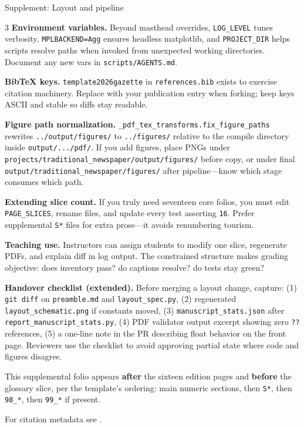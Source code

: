 \documentclass[
  ignorenonframetext,
]{beamer}
\begin{document}
\begin{frame}[fragile]{Supplement: Layout and pipeline}
\begin{multicols}{3}
\textbf{Environment variables.} Beyond masthead overrides,
\texttt{LOG\_LEVEL} tunes verbosity, \texttt{MPLBACKEND=Agg} ensures
headless matplotlib, and \texttt{PROJECT\_DIR} helps scripts resolve
paths when invoked from unexpected working directories. Document any new
vars in \texttt{scripts/AGENTS.md}.

\textbf{BibTeX keys.} \texttt{template2026gazette} in
\texttt{references.bib} exists to exercise citation machinery. Replace
with your publication entry when forking; keep keys ASCII and stable so
diffs stay readable.

\textbf{Figure path normalization.}
\texttt{\_pdf\_tex\_transforms.fix\_figure\_paths} rewrites
\texttt{../output/figures/} to \texttt{../figures/} relative to the
compile directory inside \texttt{output/.../pdf/}. If you add figures,
place PNGs under
\texttt{projects/traditional\_newspaper/output/figures/} before copy, or
under final \texttt{output/traditional\_newspaper/figures/} after
pipeline---know which stage consumes which path.

\textbf{Extending slice count.} If you truly need seventeen core folios,
you must edit \texttt{PAGE\_SLICES}, rename files, and update every test
asserting \texttt{16}. Prefer supplemental \texttt{S*} files for extra
prose---it avoids renumbering tourism.

\textbf{Teaching use.} Instructors can assign students to modify one
slice, regenerate PDFs, and explain diff in log output. The constrained
structure makes grading objective: does inventory pass? do captions
resolve? do tests stay green?

\textbf{Handover checklist (extended).} Before merging a layout change,
capture: (1) \texttt{git\ diff} on \texttt{preamble.md} and
\texttt{layout\_spec.py}, (2) regenerated \texttt{layout\_schematic.png}
if constants moved, (3) \texttt{manuscript\_stats.json} after
\texttt{report\_manuscript\_stats.py}, (4) PDF validator output excerpt
showing zero \texttt{??} references, (5) a one-line note in the PR
describing float behavior on the front page. Reviewers use the checklist
to avoid approving partial state where code and figures disagree.

This supplemental folio appears \textbf{after} the sixteen edition pages
and \textbf{before} the glossary slice, per the template's ordering:
main numeric sections, then \texttt{S*}, then \texttt{98\_*}, then
\texttt{99\_*} if present.

\noindent For citation metadata see \cite{template2026gazette}.
\par\smallskip

\end{multicols}
\end{frame}
\end{document}
